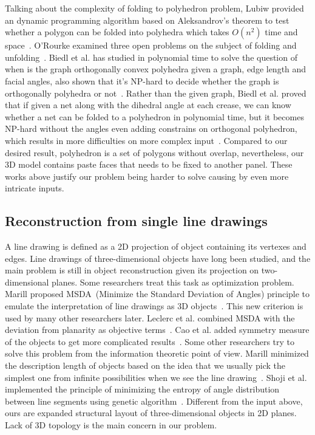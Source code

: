 Talking about the complexity of folding to polyhedron problem, Lubiw provided an dynamic programming algorithm based on Aleksandrov's theorem to test whether a polygon can be folded into polyhedra which takes $O(n^2)$ time and space~\cite{Lubiw1996When}. 
O'Rourke examined three open problems on the subject of folding and unfolding~\cite{O'Rourke:1998:FUC:646319.686376}. 
Biedl et al. has studied in polynomial time to solve the question of when is the graph orthogonally convex polyhedra given a graph, edge length and facial angles, also shown that it's NP-hard to decide whether the graph is orthogonally polyhedra or not~\cite{Biedl2004When}. Rather than the given graph, Biedl et al. proved that if given a net along with the dihedral angle at each crease, we can know whether a net can be folded to a polyhedron in polynomial time, but it becomes NP-hard without the angles even adding constrains on orthogonal polyhedron, which results in more difficulties on more complex input~\cite{Biedl:2005:NFP:1090462.1646553}.
Compared to our desired result, polyhedron is a set of polygons without overlap, nevertheless, our 3D model contains paste faces that needs to be fixed to another panel. 
These works above justify our problem being harder to solve causing by even more intricate inputs.

\subsection{Reconstruction from single line drawings} 
A line drawing is defined as a 2D projection of object containing its vertexes and edges. Line drawings of three-dimensional objects have long been studied, and the main problem is still in object reconstruction given its projection on two-dimensional planes. 
Some researchers treat this task as optimization problem. 
Marill proposed MSDA~(Minimize the Standard Deviation of Angles) principle to emulate the interpretation of line drawings as 3D objects~\cite{Marill:1991:EHI:113057.113061}. 
This new criterion is used by many other researchers later. 
Leclerc et al. combined MSDA with the deviation from planarity as objective terms~\cite{Leclerc1992An}. 
Cao et al. added symmetry measure of the objects to get more complicated results~\cite{Cao:2005:ORS:1097114.1097658}. 
Some other researchers try to solve this problem from the information theoretic point of view. 
Marill minimized the description length of objects based on the idea that we usually pick the simplest one from infinite possibilities when we see the line drawing~\cite{Marill1992Why}. 
Shoji et al. implemented the principle of minimizing the entropy of angle distribution between line segments using genetic algorithm~\cite{Shoji20013}. 
%
Different from the input above, ours are expanded structural layout of three-dimensional objects in 2D planes.
Lack of 3D topology is the main concern in our problem.

